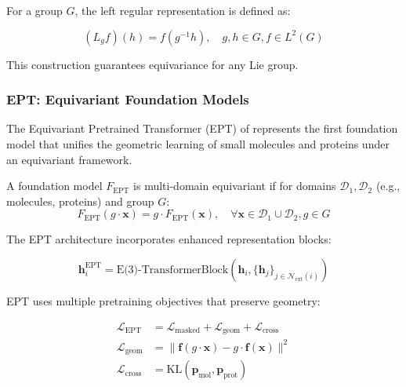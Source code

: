 For a group $G$, the left regular representation is defined as:

\begin{equation}
    (L_g f)(h) = f(g^{-1}h), \quad g, h \in G, f \in L^2(G)
    \label{eq:left_regular_representation}
\end{equation}

This construction guarantees equivariance for any Lie group.

\subsubsection{EPT: Equivariant Foundation Models}

The Equivariant Pretrained Transformer (EPT) of \citet{jiao2024ept} represents the first foundation model that unifies the geometric learning of small molecules and proteins under an equivariant framework.

\begin{definition}
    A foundation model $F_{\text{EPT}}$ is multi-domain equivariant if for domains $\mathcal{D}_1, \mathcal{D}_2$ (e.g., molecules, proteins) and group $G$:
    \begin{equation}
        F_{\text{EPT}}(g \cdot \mathbf{x}) = g \cdot F_{\text{EPT}}(\mathbf{x}), \quad \forall \mathbf{x} \in \mathcal{D}_1 \cup \mathcal{D}_2, g \in G
        \label{eq:multi_domain_equivariance}
    \end{equation}
\end{definition}

The EPT architecture incorporates enhanced representation blocks:

\begin{equation}
    \mathbf{h}_i^{\text{EPT}} = \text{E(3)-TransformerBlock}(\mathbf{h}_i, \{\mathbf{h}_j\}_{j \in \mathcal{N}_{\text{ext}}(i)})
    \label{eq:ept_enhanced_block}
\end{equation}

EPT uses multiple pretraining objectives that preserve geometry:

\begin{align}
    \mathcal{L}_{\text{EPT}} &= \mathcal{L}_{\text{masked}} + \mathcal{L}_{\text{geom}} + \mathcal{L}_{\text{cross}} \\
    \mathcal{L}_{\text{geom}} &= \|\mathbf{f}(g \cdot \mathbf{x}) - g \cdot \mathbf{f}(\mathbf{x})\|^2 \\
    \mathcal{L}_{\text{cross}} &= \text{KL}(\mathbf{p}_{\text{mol}}, \mathbf{p}_{\text{prot}})
    \label{eq:ept_loss}
\end{align}

